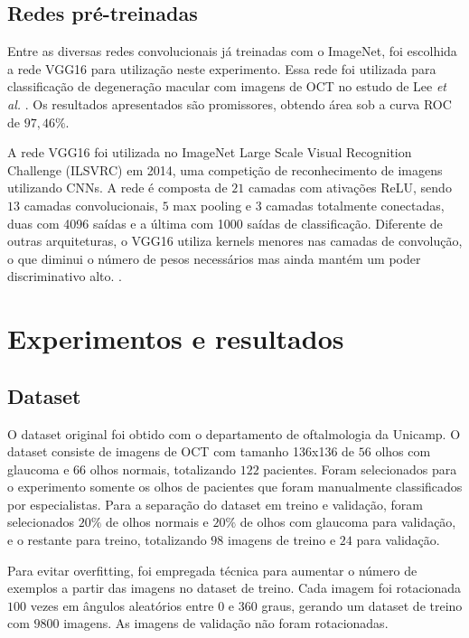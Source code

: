 \documentclass[conference]{IEEEtran}
\begin{document}
  \subsection{Redes pré-treinadas}


  Entre as diversas redes convolucionais já treinadas com o ImageNet, foi escolhida a rede VGG16 para utilização neste experimento. Essa rede foi utilizada para classificação de degeneração macular com imagens de OCT no estudo de Lee \textit{et al.} \cite{lee2017}. Os resultados apresentados são promissores, obtendo área sob a curva ROC de $97,46\%$.

  A rede VGG16 foi utilizada no ImageNet Large Scale Visual Recognition Challenge (ILSVRC) em 2014, uma competição de reconhecimento de imagens utilizando CNNs. A rede é composta de $21$ camadas com ativações ReLU, sendo $13$ camadas convolucionais, $5$ max pooling e $3$ camadas totalmente conectadas, duas com 4096 saídas e a última com 1000 saídas de classificação. Diferente de outras arquiteturas, o VGG16 utiliza kernels menores nas camadas de convolução, o que diminui o número de pesos necessários mas ainda mantém um poder discriminativo alto. \cite{simonyan2014}.

\section{Experimentos e resultados}

  \subsection{Dataset}


  O dataset original foi obtido com o departamento de oftalmologia da Unicamp. O dataset consiste de imagens de OCT com tamanho 136x136 de $56$ olhos com glaucoma e $66$ olhos normais, totalizando $122$ pacientes. Foram selecionados para o experimento somente os olhos de pacientes que foram manualmente classificados por especialistas. Para a separação do dataset em treino e validação, foram selecionados $20\%$ de olhos normais e $20\%$ de olhos com glaucoma para validação, e o restante para treino, totalizando $98$ imagens de treino e $24$ para validação.

  Para evitar overfitting, foi empregada técnica para aumentar o número de exemplos a partir das imagens no dataset de treino. Cada imagem foi rotacionada $100$ vezes em ângulos aleatórios entre $0$ e $360$ graus, gerando um dataset de treino com $9800$ imagens. As imagens de validação não foram rotacionadas.
\end{document}
